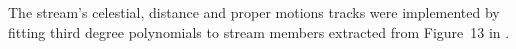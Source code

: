 The stream's celestial, distance and proper motions tracks were implemented by fitting third degree polynomials to stream members extracted from Figure~13 in \citet{Ibata2021}. 
